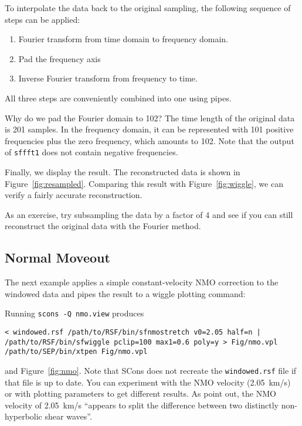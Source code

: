 To interpolate the data back to the original sampling, the following sequence
of steps can be applied:
\begin{enumerate}
\item Fourier transform from time domain to frequency domain.
\item Pad the frequency axis
\item Inverse Fourier transform from frequency to time.
\end{enumerate}
All three steps are conveniently combined into one using pipes.


Why do we pad the Fourier domain to 102? The time length of the original data
is 201 samples. In the frequency domain, it can be represented with 101
positive frequencies plus the zero frequency, which amounts to 102. Note that
the output of \texttt{sffft1} does not contain negative frequencies.

Finally, we display the result. The reconstructed data is shown in
Figure~\ref{fig:resampled}. Comparing this result with
Figure~\ref{fig:wiggle}, we can verify a fairly accurate reconstruction.



As an exercise, try subsampling the data by a factor of 4 and see if you can
still reconstruct the original data with the Fourier method.

\subsection{Normal Moveout}

The next example applies a simple constant-velocity NMO correction to the
windowed data
and pipes the result to a wiggle plotting command:


Running \texttt{scons -Q nmo.view} produces 
\begin{verbatim}
< windowed.rsf /path/to/RSF/bin/sfnmostretch v0=2.05 half=n | 
/path/to/RSF/bin/sfwiggle pclip=100 max1=0.6 poly=y > Fig/nmo.vpl
/path/to/SEP/bin/xtpen Fig/nmo.vpl
\end{verbatim}
and Figure~\ref{fig:nmo}. Note that SCons does not recreate the
\texttt{windowed.rsf} file if that file is up to date. You can
experiment with the NMO velocity (2.05~km/s) or with plotting
parameters to get different results. As \cite[]{Dellinger.sep.73.461}
point out, the NMO velocity of 2.05~km/s ``appears to split the
difference between two distinctly non-hyperbolic shear waves''.

